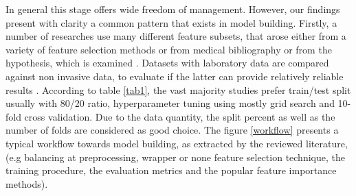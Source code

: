 \documentclass[journal,article,submit,pdftex,moreauthors]{Definitions/mdpi}
\begin{document}
In general this stage offers wide freedom of management. However, our findings present with clarity a common pattern that exists 
in model building. Firstly, a number of researches use many different feature subsets, that arose either from a variety of 
feature selection methods or from medical bibliography or from the hypothesis, which is examined \cite{Zou,Dinh,zhang,computation11050096,
kopitar2020early,fazakis}. Datasets with laboratory data are compared against non invasive data, to evaluate if the latter can provide 
relatively reliable results \cite{Dinh}. According to table \ref{tab1}, the vast majority studies prefer train/test split usually with 
80/20 ratio, hyperparameter tuning using mostly grid search and 10-fold cross validation. Due to the data quantity, the split
percent as well as the number of folds are considered as good choice. The figure \ref{workflow} presents a typical workflow towards
model building, as extracted by the reviewed literature, (e.g balancing at preprocessing, wrapper or none feature selection technique,
the training procedure, the evaluation metrics and the popular feature importance methods).
\end{document}
